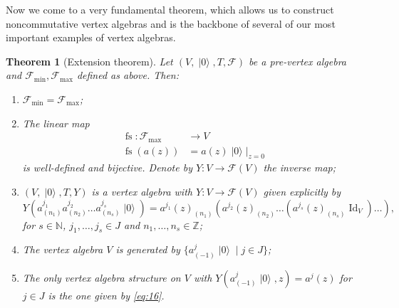 \documentclass[a4paper, 12pt, reqno]{amsart}
\newtheorem{theorem}{Theorem}[subsection]
\theoremstyle{remark}
\numberwithin{equation}{subsection}
\DeclareMathOperator{\Id}{Id}
\DeclareMathOperator{\vac}{|0\rangle}
\DeclareMathOperator{\fs}{fs}
\begin{document}
Now we come to a very fundamental theorem, which allows us to construct noncommutative vertex algebras and is the backbone of several of our most important examples of vertex algebras.
\begin{theorem}[Extension theorem]
  \label{thr:15}
  Let $(V, \vac, T, \mathcal{F})$ be a pre-vertex algebra and $\mathcal{F}_{\min}, \mathcal{F}_{\max}$ defined as above.
  Then:
  \begin{enumerate}
  \item $\mathcal{F}_{\min} = \mathcal{F}_{\max}$;
  \item The linear map
    \begin{align*}
      \fs: \mathcal{F}_{\max} &\to V \\
      \fs(a(z)) &= a(z)\vac|_{z = 0}
    \end{align*}
    is well-defined and bijective.
    Denote by $Y: V \to \mathcal{F}(V)$ the inverse map;
  \item $(V, \vac, T, Y)$ is a vertex algebra with $Y: V \to \mathcal{F}(V)$ given explicitly by
    \begin{equation}
      \label{eq:16}
      Y(a^{j_1}_{(n_1)}a^{j_2}_{(n_2)}\dots a^{j_s}_{(n_s)}\vac) = a^{j_1}(z)_{(n_1)}(a^{j_2}(z)_{(n_2)}\dots (a^{j_s}(z)_{(n_s)}\Id_V)\dots),
    \end{equation}
    for $s \in \mathbb{N}$, $j_1, \dots, j_s \in J$ and $n_1, \dots, n_s \in \mathbb{Z}$;
  \item The vertex algebra $V$ is generated by $\{a^j_{(-1)}\vac \mid j \in J\}$;
  \item The only vertex algebra structure on $V$ with $Y(a^j_{(-1)}\vac, z) = a^j(z)$ for $j \in J$ is the one given by \eqref{eq:16}.
  \end{enumerate}
\end{theorem}
\end{document}
